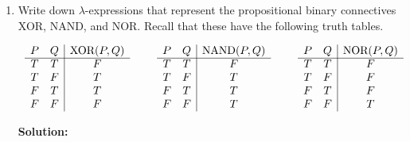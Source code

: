 \documentclass[11pt]{report}
\begin{document}
\begin{enumerate}
\begin{enumerate}
			{\bf Solution:}
			\begin{align*}
				\IMP \ \FALSE \ \TRUE &= (\lambda p. \ \lambda q. \ p \ q \ (\NOT \ p)) \ \FALSE \ \TRUE \\
				&\beq \FALSE \ \TRUE \ (\NOT \ \FALSE) \\
				&= (\lambda p. \ \lambda q. \ q) \ \TRUE \ (\NOT \ \FALSE) \\ 
				&\beq (\lambda q. \ q) \ (\NOT \FALSE) \\
				&\beq \NOT \ \FALSE \\
				&= (\lambda p. \ p \ \FALSE \ \TRUE) \ \FALSE \\ 
				&\beq \FALSE \ \FALSE \ \TRUE \\
				&= (\lambda p. \ \lambda q. \ q) \ \FALSE \ \TRUE \\
				&\beq (\lambda q. \ q) \ \TRUE \\
				&\beq \TRUE				
			\end{align*} 

		\end{enumerate} 

	
		
	\newpage
	\item Write down $\lambda$-expressions that represent the propositional binary connectives XOR, NAND, and NOR. Recall that these have the following truth tables.
			
	\vspace{0.5cm}

	\begin{center}
		$\begin{array}{c c c}

			\begin{array}{ c c | c }			
				P & Q & \text{XOR}(P,Q)\\
				\cline{1 - 3}
				T & T & F \\ 
				T & F & T \\ 
				F & T & T \\ 
				F & F & F
			\end{array} 
			& \hspace{0.5cm}
			\begin{array}{ c c | c }			
				P & Q & \text{NAND}(P,Q)\\
				\cline{1 - 3}
				T & T & F \\ 
				T & F & T \\ 
				F & T & T \\ 
				F & F & T
			\end{array} 
			& \hspace{0.5cm}
			\begin{array}{ c c | c }			
				P & Q & \text{NOR}(P,Q)\\
				\cline{1 - 3}
				T & T & F \\ 
				T & F & F \\ 
				F & T & F \\ 
				F & F & T
			\end{array} 
		\end{array}$
	\end{center}
	{\bf Solution:}


\end{enumerate}
\end{document}
